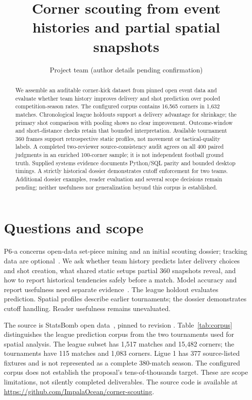 \documentclass[sigconf,nonacm]{acmart}
\title{Corner scouting from event histories and partial spatial snapshots}
\author{Project team (author details pending confirmation)}
\affiliation{\institution{Affiliation pending confirmation}\city{Pending confirmation}\country{Canada}}
\newcommand{\codehash}[1]{\texttt{\seqsplit{#1}}}
\begin{document}
\raggedbottom
\begin{abstract}
We assemble an auditable corner-kick dataset from pinned open event data and
evaluate whether team history improves delivery and shot prediction over pooled
competition-season rates. The configured corpus contains 16,565 corners in 1,632
matches. Chronological league holdouts support a delivery advantage for shrinkage;
the primary shot comparison with pooling shows no clear improvement. Outcome-window
and short-distance checks retain that bounded interpretation. Available tournament
360 frames support retrospective static profiles, not movement or tactical-quality
labels. A completed two-reviewer source-consistency audit agrees on all 400 paired
judgments in an enriched 100-corner sample; it is not independent football ground
truth. Supplied systems evidence documents Python/SQL parity and bounded desktop
timings. A strictly historical dossier demonstrates cutoff enforcement for two teams.
Additional dossier examples, reader evaluation and several scope decisions remain
pending; neither usefulness nor generalization beyond this corpus is established.
\end{abstract}
\maketitle

\section{Questions and scope}
P6-a concerns open-data set-piece mining and an initial scouting dossier;
tracking data are optional~\cite{program2026}. We ask whether team history
predicts later delivery choices and shot creation, what shared static setups
partial 360 snapshots reveal, and how to report historical tendencies safely
before a match. Model accuracy and report usefulness need separate
evidence~\cite{davis2024}. The league holdout evaluates prediction. Spatial
profiles describe earlier tournaments; the dossier demonstrates cutoff handling.
Reader usefulness remains unevaluated.

The source is StatsBomb open data~\cite{statsbomb}, pinned to revision
\codehash{4b73468fc5b0f1950f9f66fada70ad3a4f9327cb}.
Table~\ref{tab:corpus} distinguishes the league prediction corpus from the two
tournaments used for spatial analysis. The league subset has 1,517 matches and
15,482 corners; the tournaments have 115 matches and 1,083 corners. Ligue 1 has
377 source-listed fixtures and is not represented as a complete 380-match season.
The configured corpus does not establish the proposal's tens-of-thousands target.
These are scope limitations, not silently completed deliverables. The source code
is available at \url{https://github.com/ImpalaOcean/corner-scouting}.

\end{document}
